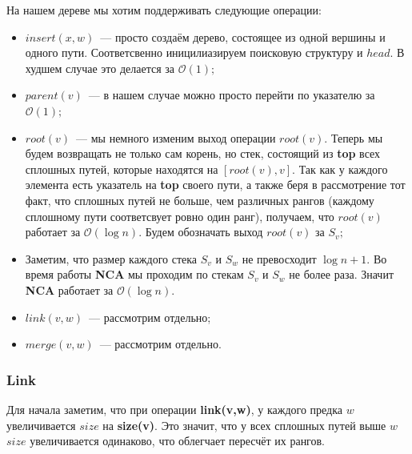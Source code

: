 На нашем дереве мы хотим поддерживать следующие операции:
\begin{itemize}
    \item $insert(x, w)$~--- просто создаём дерево, состоящее из одной вершины и одного пути. Соответсвенно иницилиазируем поисковую структуру и $head.$ В худшем случае это делается за $\mathcal{O}(1);$
    \item $parent(v)$~--- в нашем случае можно просто перейти по указателю за $\mathcal{O}(1);$
    \item $root(v)$~--- мы немного изменим выход операции $root(v).$ Теперь мы будем возвращать не только сам корень, но стек, состоящий из \textbf{top} всех сплошных путей, которые находятся на $[root(v), v].$ Так как у каждого элемента есть указатель на \textbf{top} своего пути, а также беря в рассмотрение тот факт, что сплошных путей не больше, чем различных рангов (каждому сплошному пути соответсвует ровно один ранг), получаем, что $root(v)$ работает за $\mathcal{O}(\log{n}).$ Будем обозначать выход $root(v)$ за $S_v;$
    \item 
    \begin{algorithmic}[1]
        \State\Return {$\varnothing$}
    \Else
        \EndWhile
            \State{}
        \EndIf
            \State{}
        \EndIf
            \State{}
        \EndIf
            \State{}
        \EndIf
    \EndIf
\EndProcedure
\end{algorithmic}
Заметим, что размер каждого стека $S_v$ и $S_w$ не превосходит $\log{n} + 1.$ Во время работы \textbf{NCA} мы проходим по стекам $S_v$ и $S_w$ не более раза. Значит \textbf{NCA} работает за  $\mathcal{O}(\log{n}).$
    \item $link(v, w)$~--- рассмотрим отдельно;
    \item $merge(v, w)$~--- рассмотрим отдельно.
\end{itemize}

\subsubsection{Link}
Для начала заметим, что при операции \textbf{link(v,w)}, у каждого предка $w$ увеличивается $size$ на \textbf{size(v)}. Это значит, что у всех сплошных путей выше $w$ $size$ увеличивается одинаково, что облегчает пересчёт их рангов.

